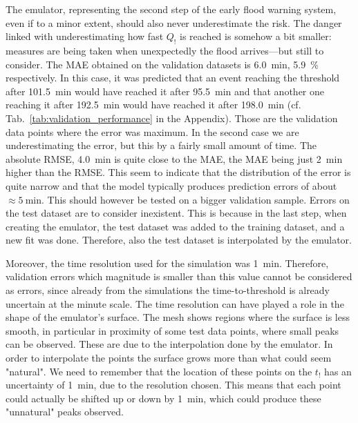 The emulator, representing the second step of the early flood warning system, even if to a minor extent, should also never underestimate the risk.
The danger linked with underestimating how fast $Q_!$ is reached is somehow a bit smaller: measures are being taken when unexpectedly the flood arrives---but still to consider.
The MAE obtained on the validation datasets is \SI{6.0}{\minute}, \SI{5.9}{\percent} respectively.
In this case, it was predicted that an event reaching the threshold after \SI{101.5}{\minute} would have reached it after \SI{95.5}{\minute} and that another one reaching it after \SI{192.5}{\minute} would have reached it after \SI{198.0}{\minute} (cf. Tab.~\ref{tab:validation_performance} in the Appendix).
Those are the validation data points where the error was maximum.
In the second case we are underestimating the error, but this by a fairly small amount of time.
The absolute RMSE, \SI{4.0}{\minute} is quite close to the MAE, the MAE being just \SI{2}{\minute} higher than the RMSE.
This seem to indicate that the distribution of the error is quite narrow and that the model typically produces prediction errors of about $\approx \SI{5}{\minute}$.
This should however be tested on a bigger validation sample.
Errors on the test dataset are to consider inexistent.
This is because in the last step, when creating the emulator, the test dataset was added to the training dataset, and a new fit was done.
Therefore, also the test dataset is interpolated by the emulator.

Moreover, the time resolution used for the simulation was \SI{1}{\minute}. Therefore, validation errors which magnitude is smaller than this value cannot be considered as errors, since already from the simulations the time-to-threshold is already uncertain at the minute scale.
The time resolution can have played a role in the shape of the emulator's surface.
The mesh shows regions where the surface is less smooth, in particular in proximity of some test data points, where small peaks can be observed.
These are due to the interpolation done by the emulator.
In order to interpolate the points the surface grows more than what could seem "natural".
We need to remember that the location of these points on the $t_!$ has an uncertainty of \SI{1}{\minute}, due to the resolution chosen.
This means that each point could actually be shifted up or down by \SI{1}{\minute}, which could produce these "unnatural" peaks observed.

